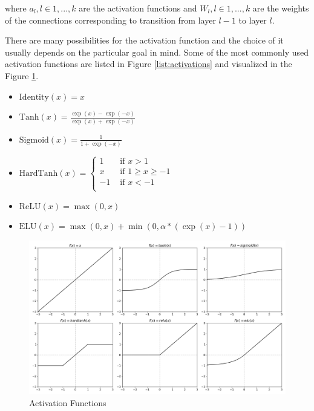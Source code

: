 where $a_l, l \in {1, ..., k}$ are the activation functions and $W_l, l \in {1, ..., k}$ are the weights of the connections corresponding to transition from layer $l-1$ to layer $l$.

There are many possibilities for the activation function and the choice of it usually depends on the particular goal in mind.
Some of the most commonly used activation functions are listed in Figure \ref{list:activations} and visualized in the Figure \ref{fig:activation_functions}.

\begin{itemize}
    \item $\text{Identity}(x) = x$
    \item $\text{Tanh}(x) = \frac{\exp(x) - \exp(-x)}{\exp(x) + \exp(-x)}$
    \item $\text{Sigmoid}(x) = \frac{1}{1 + \exp(-x)}$
    \item $\text{HardTanh}(x) = \begin{cases}
             1 & \text{ if } x > 1 \\
             x & \text{ if } 1 \geq x \geq -1 \\
            -1 & \text{ if } x < -1 \\
          \end{cases}$
    \item $\text{ReLU}(x) = \max(0, x)$
    \item $\text{ELU}(x) = \max(0,x) + \min(0, \alpha * (\exp(x) - 1))$
    \label{list:activations}
\end{itemize}

\begin{figure}
    \centering
    \includegraphics[width=\linewidth]{imgs_tomas/activation_functions.png}
    \caption{Activation Functions}
    \label{fig:activation_functions}
\end{figure}

